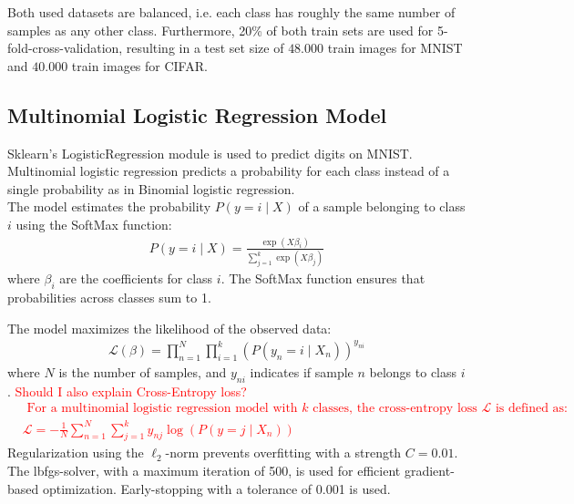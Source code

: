 \documentclass{article}
\theoremstyle{plain}
\theoremstyle{definition}
\theoremstyle{remark}
\begin{document}
Both used datasets are balanced, i.e. each class has roughly the same number of samples as any other class. Furthermore, 20\% of both train sets are used for 5-fold-cross-validation, resulting in a test set size of $48.000$ train images for MNIST and $40.000$ train images for CIFAR.

\subsection{Multinomial Logistic Regression Model}
Sklearn's LogisticRegression module is used to predict digits on MNIST. Multinomial logistic regression predicts a probability for each class instead of a single probability as in Binomial logistic regression.
\\
The model estimates the probability $P(y=i \mid X)$ of a sample belonging to class $i$ using the SoftMax function:
\begin{align}
	P(y=i \mid X)=\frac{\exp \left(X \beta_i\right)}{\sum_{j=1}^k \exp \left(X \beta_j\right)}
\end{align}
where $\beta_i$ are the coefficients for class $i$. The SoftMax function ensures that probabilities across classes sum to 1.

The model maximizes the likelihood of the observed data:
\begin{align}
	\mathcal{L}(\beta)=\prod_{n=1}^N \prod_{i=1}^k\left(P\left(y_n=i \mid X_n\right)\right)^{y_{n i}}
\end{align}
where $N$ is the number of samples, and $y_{n i}$ indicates if sample $n$ belongs to class $i$. \textcolor{red}{Should I also explain Cross-Entropy loss? $\begin{aligned}
		&\text { For a multinomial logistic regression model with } k \text { classes, the cross-entropy loss } \mathcal{L} \text { is defined as: }\\
		&\mathcal{L}=-\frac{1}{N} \sum_{n=1}^N \sum_{j=1}^k y_{n j} \log \left(P\left(y=j \mid X_n\right)\right)
\end{aligned}$}\\
Regularization using the $\ell_2$-norm prevents overfitting with a strength $C=0.01$. The lbfgs-solver, with a maximum iteration of 500, is used for efficient gradient-based optimization. Early-stopping with a tolerance of 0.001 is used. \\
\end{document}
